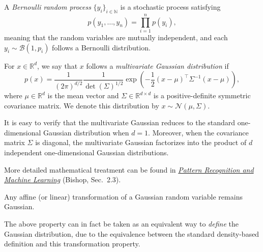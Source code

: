 \documentclass[../main]{subfiles}
\begin{document}
\begin{definition}
    A \emph{Bernoulli random process} $\{y_i\}_{i\in\mathbb{N}}$ is a stochastic process satisfying
    \begin{equation}
        p(y_1,\dots,y_n)
        = \prod_{i=1}^n p(y_i),
    \end{equation}
    meaning that the random variables are mutually independent, and each
$
        y_i \sim \mathcal{B}(1, p_i)
$
    follows a Bernoulli distribution.
\end{definition}
\begin{definition}
    For $x\in\mathbb{R}^d$, we say that $x$ follows a \emph{multivariate Gaussian distribution} if
    \begin{equation}
        p(x)
        = \frac{1}{(2\pi)^{d/2}}
          \frac{1}{\det(\Sigma)^{1/2}}
          \exp\left(
              -\frac{1}{2}(x-\mu)^\top \Sigma^{-1} (x-\mu)
          \right),
    \end{equation}
    where $\mu\in\mathbb{R}^d$ is the mean vector and $\Sigma\in\mathbb{R}^{d\times d}$ is a positive-definite symmetric covariance matrix.
    We denote this distribution by
    $
        x \sim \mathcal{N}(\mu, \Sigma).
$
\end{definition}

It is easy to verify that the multivariate Gaussian reduces to the standard one-dimensional
Gaussian distribution when $d=1$.
Moreover, when the covariance matrix $\Sigma$ is diagonal, the multivariate Gaussian
factorizes into the product of $d$ independent one-dimensional Gaussian distributions.

\begin{remark}
    More detailed mathematical treatment can be found in
    \href{https://www.microsoft.com/en-us/research/wp-content/uploads/2006/01/Bishop-Pattern-Recognition-and-Machine-Learning-2006.pdf}{\emph{Pattern Recognition and Machine Learning}} (Bishop, Sec.~2.3).
\end{remark}

    
    \begin{theorem}
        Any affine (or linear) transformation of a Gaussian random variable
        remains Gaussian.
    \end{theorem}
    
    The above property can in fact be taken as an equivalent way to
    \emph{define} the Gaussian distribution, due to the equivalence between the
    standard density-based definition and this transformation property.
    
\end{document}
